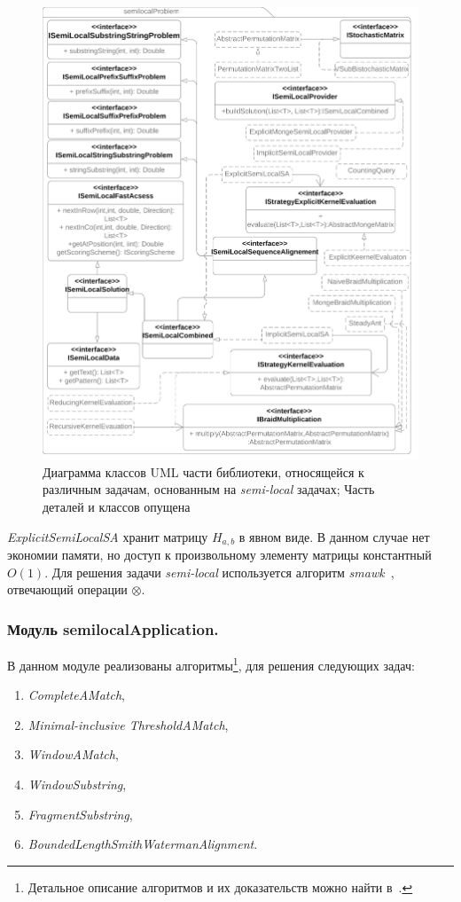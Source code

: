 \begin{figure}
  \centering
  \includegraphics[height=0.72\columnwidth,angle=90]{Mishin/figures/Library.png}
  \caption{Диаграмма классов UML части библиотеки, относящейся к различным задачам, основанным на  \emph{semi-local} задачах; Часть деталей и классов опущена}\label{fig:libraryProblem}
\end{figure}

\emph{ExplicitSemiLocalSA} хранит матрицу $H_{a,b}$ в явном виде.
В данном случае нет экономии памяти, но доступ к произвольному элементу матрицы константный $O(1)$. 
Для решения задачи \emph{semi-local} используется алгоритм \emph{smawk}~\cite{aggarwal1987geometric}, отвечающий операции  $\otimes$.






\subsubsection{Модуль semilocalApplication.}
В данном модуле реализованы алгоритмы\footnote{Детальное описание алгоритмов и их доказательств можно найти в~\cite{tiskin2006all}.}, для решения следующих задач:
\begin{enumerate}
    \item \emph{CompleteAMatch},
    \item \emph{Minimal-inclusive ThresholdAMatch},
    \item \emph{WindowAMatch},
    \item \emph{WindowSubstring},
    \item \emph{FragmentSubstring},
    \item \emph{BoundedLengthSmithWatermanAlignment}.
\end{enumerate}

